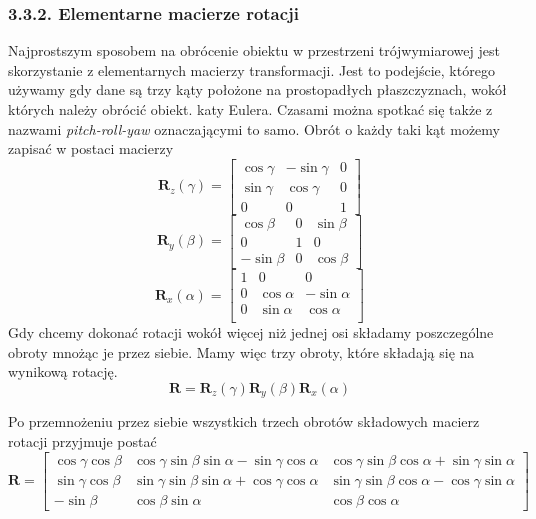 \documentclass{article}
\begin{document}
\subsubsection*{\Large{3.3.2. Elementarne macierze rotacji}}
Najprostszym sposobem na obrócenie obiektu w przestrzeni trójwymiarowej jest skorzystanie z elementarnych macierzy transformacji. Jest to podejście, którego używamy gdy dane są trzy kąty położone na prostopadłych płaszczyznach, wokół których należy obrócić obiekt. katy Eulera. Czasami można spotkać się także z nazwami \emph{pitch-roll-yaw} oznaczającymi to samo. Obrót o każdy taki kąt możemy zapisać w postaci macierzy
\[
\mathbf{R}_z(\gamma) = \begin{bmatrix}
\cos \gamma & -\sin \gamma & 0 \\
\sin \gamma & \cos \gamma & 0 \\
0 & 0 & 1
\end{bmatrix}
\]
\[
\mathbf{R}_y(\beta) = \begin{bmatrix}
\cos \beta & 0 & \sin \beta \\
0 & 1 & 0 \\
-\sin \beta & 0 & \cos \beta
\end{bmatrix}
\]
\[
\mathbf{R}_x(\alpha) = \begin{bmatrix}
1 & 0 & 0 \\
0 & \cos \alpha & -\sin \alpha \\
0 & \sin \alpha & \cos \alpha \\
\end{bmatrix}
\]
Gdy chcemy dokonać rotacji wokół więcej niż jednej osi składamy poszczególne obroty mnożąc je przez siebie. Mamy więc trzy obroty, które składają się na wynikową rotację.
\[\mathbf{R} = \mathbf{R}_z(\gamma)\mathbf{R}_y(\beta)\mathbf{R}_x(\alpha)\]

Po przemnożeniu przez siebie wszystkich trzech obrotów składowych macierz rotacji przyjmuje postać
\[
\mathbf{R} = \begin{bmatrix}
\cos \gamma \cos \beta & 
\cos \gamma \sin \beta \sin \alpha - \sin \gamma \cos \alpha &
\cos \gamma \sin \beta \cos \alpha + \sin \gamma \sin \alpha \\
\sin \gamma \cos \beta &
\sin \gamma \sin \beta \sin \alpha + \cos \gamma \cos \alpha &
\sin \gamma \sin \beta \cos \alpha - \cos \gamma \sin \alpha \\
-\sin \beta & \cos \beta \sin \alpha & \cos \beta \cos \alpha
\end{bmatrix}
\]
\end{document}
